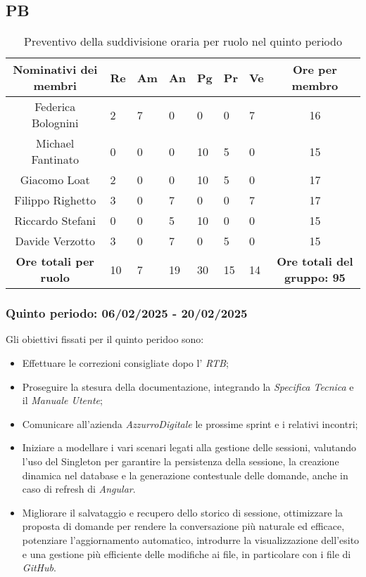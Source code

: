 \newpage
\subsection{PB}
\begin{table}[h!]
    \centering
    \renewcommand{\arraystretch}{1.5}
    \begin{tabularx}{\textwidth}{|c|X|X|X|X|X|X|c|}\hline
    \rowcolor[HTML]{FFD700} 
    \textbf{Nominativi dei membri} & \textbf{Re} & \textbf{Am} & \textbf{An} & \textbf{Pg} & \textbf{Pr} & \textbf{Ve} & \textbf{Ore per membro} \\ \hline
    Federica Bolognini  & 2 & 7 & 0 & 0 & 0 & 7 & 16 \\ \hline
    Michael Fantinato   & 0 & 0 & 0 & 10 & 5 & 0 & 15  \\ \hline
    Giacomo Loat        & 2 & 0 & 0 & 10 & 5 & 0 & 17  \\ \hline
    Filippo Righetto    & 3 & 0 & 7 & 0 & 0 & 7 & 17 \\ \hline
    Riccardo Stefani    & 0 & 0 & 5 & 10 & 0 & 0 & 15 \\ \hline
    Davide Verzotto     & 3 & 0 & 7 & 0 & 5 & 0 & 15  \\ \hline
    \rowcolor[HTML]{FFD700} 
    \textbf{Ore totali per ruolo} & 10 & 7 & 19 & 30 & 15 & 14 & \textbf{Ore totali del gruppo: 95} \\ \hline
    \end{tabularx}
    \caption{Preventivo della suddivisione oraria per ruolo nel quinto periodo}
\end{table}

\subsubsection{Quinto periodo: 06/02/2025 - 20/02/2025}
\label{sec:prev_cons_quinto_periodo}  
Gli obiettivi fissati per il quinto peridoo sono:
\begin{itemize}
    \item Effettuare le correzioni consigliate dopo l' \emph{RTB};
    \item Proseguire la stesura della documentazione, integrando la \emph{Specifica Tecnica} e il \emph{Manuale Utente};
    \item Comunicare all'azienda \emph{AzzurroDigitale} le prossime sprint e i relativi incontri;
    \item Iniziare a modellare i vari scenari legati alla gestione delle sessioni, valutando l’uso del Singleton per garantire la persistenza della sessione, la creazione dinamica nel database e la generazione contestuale delle domande, anche in caso di refresh di \emph{Angular}.
    \item Migliorare il salvataggio e recupero dello storico di sessione, ottimizzare la proposta di domande per rendere la conversazione più naturale ed efficace, potenziare l’aggiornamento automatico, introdurre la visualizzazione dell’esito e una gestione più efficiente delle modifiche ai file, in particolare con i file di \emph{GitHub}.
\end{itemize}

